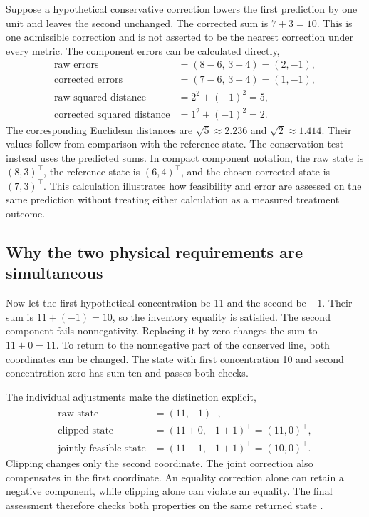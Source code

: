 Suppose a hypothetical conservative correction lowers the first prediction by one unit and leaves the second unchanged. The corrected sum is $7+3=10$. This is one admissible correction and is not asserted to be the nearest correction under every metric. The component errors can be calculated directly,
\[
\begin{aligned}
\text{raw errors}&=(8-6,\,3-4)=(2,-1),\\
\text{corrected errors}&=(7-6,\,3-4)=(1,-1),\\
\text{raw squared distance}&=2^2+(-1)^2=5,\\
\text{corrected squared distance}&=1^2+(-1)^2=2.
\end{aligned}
\]
The corresponding Euclidean distances are $\sqrt5\approx2.236$ and $\sqrt2\approx1.414$. Their values follow from comparison with the reference state. The conservation test instead uses the predicted sums. In compact component notation, the raw state is $(8,3)^\top$, the reference state is $(6,4)^\top$, and the chosen corrected state is $(7,3)^\top$. This calculation illustrates how feasibility and error are assessed on the same prediction without treating either calculation as a measured treatment outcome.

\subsection{Why the two physical requirements are simultaneous}

Now let the first hypothetical concentration be 11 and the second be $-1$. Their sum is $11+(-1)=10$, so the inventory equality is satisfied. The second component fails nonnegativity. Replacing it by zero changes the sum to $11+0=11$. To return to the nonnegative part of the conserved line, both coordinates can be changed. The state with first concentration 10 and second concentration zero has sum ten and passes both checks.

The individual adjustments make the distinction explicit,
\[
\begin{aligned}
\text{raw state}&=(11,-1)^\top,\\
\text{clipped state}&=(11+0,-1+1)^\top=(11,0)^\top,\\
\text{jointly feasible state}&=(11-1,-1+1)^\top=(10,0)^\top.
\end{aligned}
\]
Clipping changes only the second coordinate. The joint correction also compensates in the first coordinate. An equality correction alone can retain a negative component, while clipping alone can violate an equality. The final assessment therefore checks both properties on the same returned state \citep{KircherVotsmeier2025,Haddad2010}.

